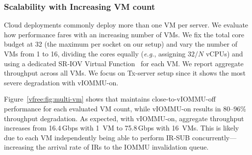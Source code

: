 







\subsubsection{{\vfreename} Scalability with Increasing VM count}
\label{vfree:sec:eval-multi-vm}

Cloud deployments commonly deploy more than one VM per server.
We evaluate how {\vfreename} performance fares with an increasing number of VMs.
We fix the total core budget at 32 (the maximum per socket on our setup) and vary the number of VMs from 1 to 16, dividing the cores equally (\textit{e.g.}, assigning $32/N$ vCPUs) and using a dedicated SR-IOV Virtual Function~\cite{ms_sriov_overview} for each VM.
We report aggregate throughput across all VMs. {We focus on Tx-server setup since it shows the most severe degradation with vIOMMU-on.}


Figure~\ref{vfree:fig:multi-vm} shows that {\vfreename} maintains close-to-vIOMMU-off performance for each evaluated VM count,
while vIOMMU-on results in 80--96\% throughput degradation. As expected, with vIOMMU-on, aggregate throughput {increases} from 16.4\,Gbps with 1~VM to 75.8\,Gbps with 16~VMs.
{This is likely due to each VM independently being able to perform IR-SUB concurrently---increasing the arrival rate of IRs to the IOMMU invalidation queue.}

